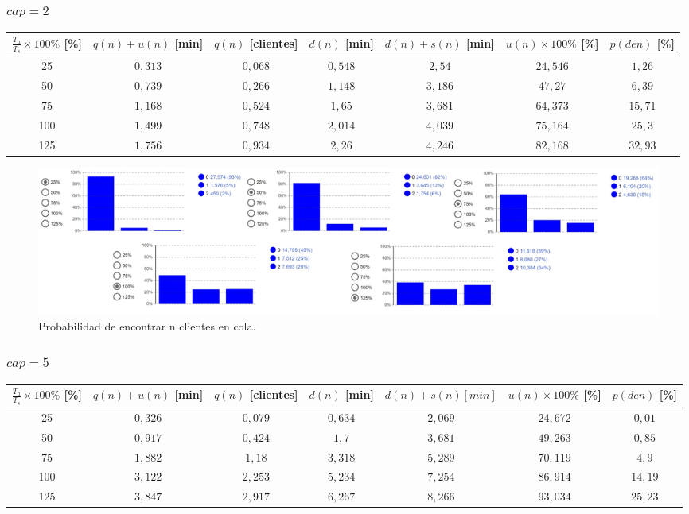\subsubsection[cap = 2]{$cap = 2$}

\begin{tabular}{||c||c|c|c|c|c|c||}
    \hline \hline
    $\frac{T_a}{T_s}\times100\%$ [\%] & $q(n)+u(n)$ [min] & $q(n)$ [clientes] & $d(n)$ [min] & $d(n)+s(n)$ [min] & $u(n)\times100\%$ [\%] & $p(den)$ [\%] \\
    \hline \hline
    25 & $0,313$ & $0,068$ & $0,548$ & $2,54$ & $24,546$ & $1,26$ \\
    \hline
    50 & $0,739$ & $0,266$ & $1,148$ & $3,186$ & $47,27$ & $6,39$ \\
    \hline
    75 & $1,168$ & $0,524$ & $1,65$ & $3,681$ & $64,373$ & $15,71$ \\
    \hline
    100 & $1,499$ & $0,748$ & $2,014$ & $4,039$ & $75,164$ & $25,3$ \\
    \hline
    125 & $1,756$ & $0,934$ & $2,26$ & $4,246$ & $82,168$ & $32,93$ \\
    \hline \hline
\end{tabular}

\begin{figure}[H]
  \includegraphics[width=\linewidth]{images/anylogic-colas-2}
  \caption{Probabilidad de encontrar n clientes en cola.}
\end{figure}

\subsubsection[cap = 5]{$cap = 5$}

\begin{tabular}{||c||c|c|c|c|c|c||}
    \hline \hline
    $\frac{T_a}{T_s}\times100\%$ [\%] & $q(n)+u(n)$ [min] & $q(n)$ [clientes] & $d(n)$ [min] & $d(n)+s(n) [min]$ & $u(n)\times100\%$ [\%] & $p(den)$ [\%] \\
    \hline \hline
    25 & $0,326$ & $0,079$ & $0,634$ & $2,069$ & $24,672$ & $0,01$ \\
    \hline
    50 & $0,917$ & $0,424$ & $1,7$ & $3,681$ & $49,263$ & $0,85$ \\
    \hline
    75 & $1,882$ & $1,18$ & $3,318$ & $5,289$ & $70,119$ & $4,9$ \\
    \hline
    100 & $3,122$ & $2,253$ & $5,234$ & $7,254$ & $86,914$ & $14,19$ \\
    \hline
    125 & $3,847$ & $2,917$ & $6,267$ & $8,266$ & $93,034$ & $25,23$ \\
    \hline \hline
\end{tabular}

